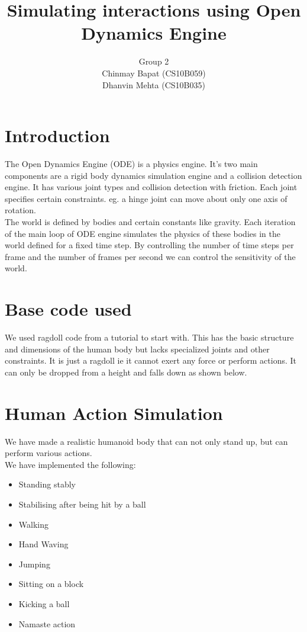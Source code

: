 \documentclass[11pt]{article}
\author{Group 2 \\Chinmay Bapat (CS10B059)\\ Dhanvin Mehta (CS10B035)}
\title{Simulating interactions using Open Dynamics Engine}
\begin{document}
\maketitle
\section{Introduction}
The Open Dynamics Engine (ODE) is a physics engine. It's two main components
are a rigid body dynamics simulation engine and a collision detection engine.
It has various joint types and collision detection with friction. Each joint
specifies certain constraints. eg. a hinge joint can move about only one
axis of rotation.\\
The world is defined by bodies and certain constants like gravity.
Each iteration of the main loop of ODE engine simulates the physics of these
bodies in the world defined for a fixed time step. By controlling the number
of time steps per frame and the number of frames per second we can control
the sensitivity of the world.

\section{Base code used}
We used ragdoll code from a tutorial to start with. This has the basic
structure and dimensions of the human body but lacks specialized joints and
other constraints. It is just a ragdoll ie it cannot exert any force or 
perform actions. It can only be dropped from a height and falls down as shown
below.

\section{Human Action Simulation}
We have made a realistic humanoid body that can not only stand up,
but can perform various actions. \\
We have implemented the following:\\
\begin{itemize}
    \item Standing stably
    \item Stabilising after being hit by a ball
    \item Walking
    \item Hand Waving
    \item Jumping
    \item Sitting on a block
    \item Kicking a ball
    \item Namaste action
\end{itemize}
\end{document}

